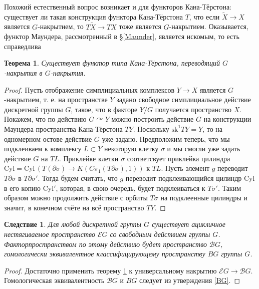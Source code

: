 \documentclass[14pt, dvipsnames, twoside]{extarticle}
\newtheorem{theorem}{Теорема}
\newtheorem{corollary}{Следствие}[theorem]
\theoremstyle{definition}
\theoremstyle{remark}
\begin{document}
Похожий естественный вопрос возникает и для функторов Кана-Тёрстона: существует ли такая конструкция функтора Кана-Тёрстона $T$, что если $\widetilde{X}\to X$ является $G$-накрытием, то $T\widetilde{X}\to TX$ тоже является $G$-накрытием. Оказывается, функтор Маундера, рассмотренный в \S\ref{Maunder}, является искомым, то есть справедлива

\begin{theorem}\label{RespectCovering}
Существует функтор типа Кана-Тёрстона, переводящий $G$-накрытия в $G$-накрытия.
\end{theorem}

\begin{proof}
Пусть отображение симплициальных комплексов $Y\to X$ является $G$-накрытием, т. е. на пространстве $Y$ задано свободное симплициальное действие дискретной группы $G$, такое, что в факторе $Y/G$ получается пространство $X$. Покажем, что по действию $G\curvearrowright Y$ можно построить действие $G$ на конструкции Маундера пространства Кана-Тёрстона $TY$. Поскольку $\mathrm{sk}^1 TY = Y$, то на одномерном остове действие $G$ уже задано. Предположим теперь, что мы подклеиваем к комплексу $L\subset Y$ некоторую клетку $\sigma$ и мы смогли уже задать действие $G$ на $TL$. Приклейке клетки $\sigma$ соответсвует приклейка цилиндра $\mathrm{Cyl} = \mathrm{Cyl}\, \left (T(\partial \sigma)\to K(C\pi_1(T\partial\sigma), 1)\right )$ к $TL$. Пусть элемент $g$ переводит $T\partial\sigma$ в $T\partial\sigma'$. Тогда будем считать, что $g$ переводит подклеивающийся цилиндр $\mathrm{Cyl}$ в его копию $\mathrm{Cyl}'$, которая, в свою очередь, будет подклеиваться к $T\sigma'$. Таким образом можно продолжить действие с орбиты $T\sigma$ на подклеенные цилиндры и значит, в конечном счёте на всё пространство $TY$.   
\end{proof}

\begin{corollary}
Для любой дискретной группы $G$ существует ацикличное нестягиваемое пространство $\mathcal{E}G$ со свободным действием группы $G$. Факторпространством по этому действию будет пространство $\mathcal{B}G$, гомологически эквивалентное классифицирующему пространству $BG$ группы $G$.
\end{corollary}

\begin{proof}
Достаточно применить теорему \ref{RespectCovering} к универсальному накрытию $\mathcal{E}G\to\mathcal{B}G$. Гомологическая эквивалентность $\mathcal{B}G$ и $BG$ следует из утверждения \ref{BG}. 
\end{proof}
\end{document}
